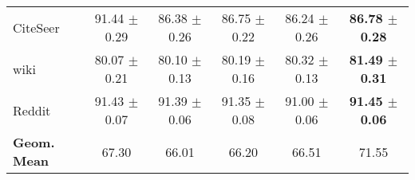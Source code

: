 \begin{table}[t]
\begin{sc}
{\begin{tabular}{@{}l|c|cccc@{}}
CiteSeer & 91.44 $\pm$ 0.29 & 86.38 $\pm$ 0.26 & 86.75 $\pm$ 0.22 & 86.24 $\pm$ 0.26 & \textbf{86.78 $\pm$ 0.28} \\
wiki & 80.07 $\pm$ 0.21 & 80.10 $\pm$ 0.13 & 80.19 $\pm$ 0.16 & 80.32 $\pm$ 0.13 & \textbf{81.49 $\pm$ 0.31} \\
Reddit & 91.43 $\pm$ 0.07 & 91.39 $\pm$ 0.06 & 91.35 $\pm$ 0.08 & 91.00 $\pm$ 0.06 & \textbf{91.45 $\pm$ 0.06} \\\bottomrule
\rowcolor[HTML]{EFEFEF} 
\textbf{Geom. Mean}	 & 67.30	& 66.01	& 66.20	& 66.51 & 71.55
\end{tabular}
}
\end{sc}
\end{table}

